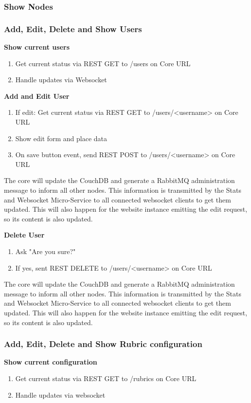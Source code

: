 \documentclass[a4paper]{article}
\begin{document}
\subsubsection{Show Nodes}

\subsubsection{Add, Edit, Delete and Show Users}
\textbf{Show current users}
\begin{enumerate}
	\item Get current status via REST GET to /users on Core URL
	\item Handle updates via Websocket
\end{enumerate}

\textbf{Add and Edit User}
\begin{enumerate}
	\item If edit: Get current status via REST GET to /users/<username> on Core URL
	\item Show edit form and place data
	\item On save button event, send REST POST to /users/<username> on Core URL
\end{enumerate}
The core will update the CouchDB and generate a RabbitMQ administration message to inform all other nodes. This information is transmitted by the Stats and Websocket Micro-Service to all connected websocket clients to get them updated. This will also happen for the website instance emitting the edit request, so its content is also updated.


\textbf{Delete User}
\begin{enumerate}
	\item Ask "Are you sure?"
	\item If yes, sent REST DELETE to /users/<username> on Core URL
\end{enumerate}
The core will update the CouchDB and generate a RabbitMQ administration message to inform all other nodes. This information is transmitted by the Stats and Websocket Micro-Service to all connected websocket clients to get them updated. This will also happen for the website instance emitting the edit request, so its content is also updated.


\subsubsection{Add, Edit, Delete and Show Rubric configuration}
\textbf{Show current configuration}
\begin{enumerate}
	\item Get current status via REST GET to /rubrics on Core URL
	\item Handle updates via websocket
\end{enumerate}
\end{document}
